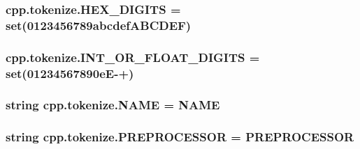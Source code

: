 \subsubsection[{\texorpdfstring{H\+E\+X\+\_\+\+D\+I\+G\+I\+TS}{HEX_DIGITS}}]{\setlength{\rightskip}{0pt plus 5cm}cpp.\+tokenize.\+H\+E\+X\+\_\+\+D\+I\+G\+I\+TS = set(\textquotesingle{}0123456789abcdef\+A\+B\+C\+D\+E\+F\textquotesingle{})}\hypertarget{namespacecpp_1_1tokenize_a8b45b0f0f2b504757e9ede9c342b2c36}{}\label{namespacecpp_1_1tokenize_a8b45b0f0f2b504757e9ede9c342b2c36}
\subsubsection[{\texorpdfstring{I\+N\+T\+\_\+\+O\+R\+\_\+\+F\+L\+O\+A\+T\+\_\+\+D\+I\+G\+I\+TS}{INT_OR_FLOAT_DIGITS}}]{\setlength{\rightskip}{0pt plus 5cm}cpp.\+tokenize.\+I\+N\+T\+\_\+\+O\+R\+\_\+\+F\+L\+O\+A\+T\+\_\+\+D\+I\+G\+I\+TS = set(\textquotesingle{}01234567890e\+E-\/+\textquotesingle{})}\hypertarget{namespacecpp_1_1tokenize_ad8c6dd06d4e6ef2e24e9186acb0aff43}{}\label{namespacecpp_1_1tokenize_ad8c6dd06d4e6ef2e24e9186acb0aff43}
\subsubsection[{\texorpdfstring{N\+A\+ME}{NAME}}]{\setlength{\rightskip}{0pt plus 5cm}string cpp.\+tokenize.\+N\+A\+ME = \textquotesingle{}N\+A\+ME\textquotesingle{}}\hypertarget{namespacecpp_1_1tokenize_aa14251ded979d72f93d7b234d8cfb584}{}\label{namespacecpp_1_1tokenize_aa14251ded979d72f93d7b234d8cfb584}
\subsubsection[{\texorpdfstring{P\+R\+E\+P\+R\+O\+C\+E\+S\+S\+OR}{PREPROCESSOR}}]{\setlength{\rightskip}{0pt plus 5cm}string cpp.\+tokenize.\+P\+R\+E\+P\+R\+O\+C\+E\+S\+S\+OR = \textquotesingle{}P\+R\+E\+P\+R\+O\+C\+E\+S\+S\+OR\textquotesingle{}}\hypertarget{namespacecpp_1_1tokenize_a3c8918ee13b9acf5ea4e70b484d67268}{}\label{namespacecpp_1_1tokenize_a3c8918ee13b9acf5ea4e70b484d67268}
